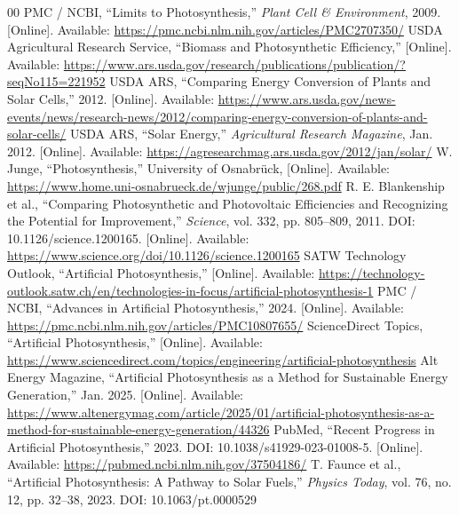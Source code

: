 \documentclass[conference]{IEEEtran}
\begin{document}
\begin{thebibliography}{00}
PMC / NCBI, ``Limits to Photosynthesis,'' \textit{Plant Cell \& Environment}, 2009. [Online]. Available: \url{https://pmc.ncbi.nlm.nih.gov/articles/PMC2707350/}
USDA Agricultural Research Service, ``Biomass and Photosynthetic Efficiency,'' [Online]. Available: \url{https://www.ars.usda.gov/research/publications/publication/?seqNo115=221952}
USDA ARS, ``Comparing Energy Conversion of Plants and Solar Cells,'' 2012. [Online]. Available: \url{https://www.ars.usda.gov/news-events/news/research-news/2012/comparing-energy-conversion-of-plants-and-solar-cells/}
USDA ARS, ``Solar Energy,'' \textit{Agricultural Research Magazine}, Jan. 2012. [Online]. Available: \url{https://agresearchmag.ars.usda.gov/2012/jan/solar/}
W. Junge, ``Photosynthesis,'' University of Osnabrück, [Online]. Available: \url{https://www.home.uni-osnabrueck.de/wjunge/public/268.pdf}
R. E. Blankenship et al., ``Comparing Photosynthetic and Photovoltaic Efficiencies and Recognizing the Potential for Improvement,'' \textit{Science}, vol. 332, pp. 805--809, 2011. DOI: 10.1126/science.1200165. [Online]. Available: \url{https://www.science.org/doi/10.1126/science.1200165}
SATW Technology Outlook, ``Artificial Photosynthesis,'' [Online]. Available: \url{https://technology-outlook.satw.ch/en/technologies-in-focus/artificial-photosynthesis-1}
PMC / NCBI, ``Advances in Artificial Photosynthesis,'' 2024. [Online]. Available: \url{https://pmc.ncbi.nlm.nih.gov/articles/PMC10807655/}
ScienceDirect Topics, ``Artificial Photosynthesis,'' [Online]. Available: \url{https://www.sciencedirect.com/topics/engineering/artificial-photosynthesis}
Alt Energy Magazine, ``Artificial Photosynthesis as a Method for Sustainable Energy Generation,'' Jan. 2025. [Online]. Available: \url{https://www.altenergymag.com/article/2025/01/artificial-photosynthesis-as-a-method-for-sustainable-energy-generation/44326}
PubMed, ``Recent Progress in Artificial Photosynthesis,'' 2023. DOI: 10.1038/s41929-023-01008-5. [Online]. Available: \url{https://pubmed.ncbi.nlm.nih.gov/37504186/}
T. Faunce et al., ``Artificial Photosynthesis: A Pathway to Solar Fuels,'' \textit{Physics Today}, vol. 76, no. 12, pp. 32--38, 2023. DOI: 10.1063/pt.0000529

\end{thebibliography}
\end{document}
